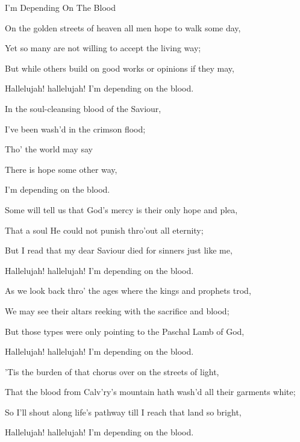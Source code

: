 \documentclass[12pt]{book}
\begin{document}
\begin{song}{I'm Depending On The Blood}{}
  {\SBPubDom}
  {}
  {}
  {}

  \begin{SBVerse}
    On the golden streets of heaven all men hope to walk some day,

    Yet so many are not willing to accept the living way;

    But while others build on good works or opinions if they may,

    Hallelujah! hallelujah! I'm depending on the blood.
  \end{SBVerse}

  \begin{SBOpGroup}
    In the soul-cleansing blood of the Saviour,

    I've been wash'd in the crimson flood;

    Tho' the world may say

    There is hope some other way,

    I'm depending on the blood.
  \end{SBOpGroup}

  \begin{SBVerse}
    Some will tell us that God's mercy is their only hope and plea,

    That a soul He could not punish thro'out all eternity;

    But I read that my dear Saviour died for sinners just like me,

    Hallelujah! hallelujah! I'm depending on the blood.
  \end{SBVerse}

  \begin{SBVerse}
    As we look back thro' the ages where the kings and prophets trod,

    We may see their altars reeking with the sacrifice and blood;

    But those types were only pointing to the Paschal Lamb of God,

    Hallelujah! hallelujah! I'm depending on the blood.
  \end{SBVerse}

  \begin{SBVerse}
    'Tis the burden of that chorus over on the streets of light,

    That the blood from Calv'ry's mountain hath wash'd all their garments white;

    So I'll shout along life's pathway till I reach that land so bright,

    Hallelujah! hallelujah! I'm depending on the blood.
  \end{SBVerse}
\end{song}
\end{document}
